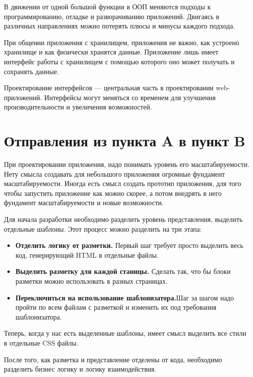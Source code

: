 В движении от одной большой функции в ООП меняются подходы к программированию, отладке и разворачиванию приложений. Двигаясь в различных направлениях можно потерять плюсы и минусы каждого подхода.

При общении приложения с хранилищем, приложения не важно, как устроено хранилище и как физически хранятся данные. Приложение лишь имеет интерфейс работы с хранилищем с помощью которого оно может получать и сохранять данные.


Проектирование интерфейсов --- центральная часть в проектировании web-приложений. Интерфейсы могут меняться со временем для улучшения производительности и увеличения возможностей. 

\section{ Отправления из пункта A в пункт B } \label{sect2_4}

При проектировании приложения, надо понимать уровень его масштабируемости. Нету смысла создавать для небольшого приложения огромные фундамент масштабируемости. Иногда есть смысл создать прототип приложения, для того чтобы запустить приложение как можно скорее, а потом внедрять в него фундамент масштабируемости и новые возможности.

Для начала разработки необходимо разделить уровень представления, выделить отдельные шаблоны. Этот процесс можно разделить на три этапа:
\begin{itemize}

\item \textbf{Отделить логику от разметки.} Первый шаг требует просто выделить весь код, генерирующий HTML в отдельные файлы.

\item \textbf{Выделить разметку для каждой станицы.} Сделать так, что бы блоки разметки можно использовать в разных страницах.

\item \textbf{Переключиться на использование шаблонизатора.}Шаг за шагом надо пройти по всем файлам с разметкой и изменить их под требования шаблонизатора.

\end{itemize}

Теперь, когда у нас есть выделенные шаблоны, имеет смысл выделить все стили в отдельные CSS файлы.


После того, как разметка и представление отделены от кода, необходимо разделить бизнес логику и логику взаимодействия.

